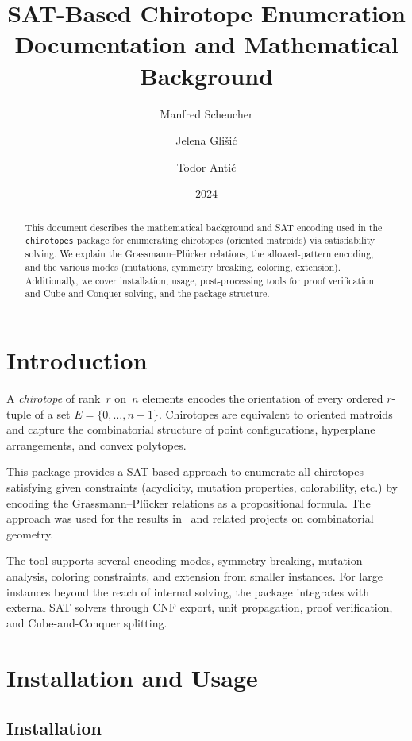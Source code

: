 \documentclass[11pt]{article}
\title{SAT-Based Chirotope Enumeration\\[0.3em]
\large Documentation and Mathematical Background}
\author{Manfred Scheucher \and Jelena Gli\v{s}i\'{c} \and Todor Anti\'{c}}
\date{2024}
\theoremstyle{definition}
\begin{document}
\maketitle

\begin{abstract}
This document describes the mathematical background and SAT encoding used in the \texttt{chirotopes} package for enumerating chirotopes (oriented matroids) via satisfiability solving.
We explain the Grassmann--Pl\"ucker relations, the allowed-pattern encoding, and the various modes (mutations, symmetry breaking, coloring, extension).
Additionally, we cover installation, usage, post-processing tools for proof verification and Cube-and-Conquer solving, and the package structure.
\end{abstract}

\tableofcontents

\section{Introduction}

A \emph{chirotope} of rank~$r$ on~$n$ elements encodes the orientation of every ordered $r$-tuple of a set $E = \{0, \ldots, n-1\}$. Chirotopes are equivalent to oriented matroids and capture the combinatorial structure of point configurations, hyperplane arrangements, and convex polytopes.

This package provides a SAT-based approach to enumerate all chirotopes satisfying given constraints (acyclicity, mutation properties, colorability, etc.) by encoding the Grassmann--Pl\"ucker relations as a propositional formula. The approach was used for the results in~\cite{EmptyHexagon} and related projects on combinatorial geometry.

The tool supports several encoding modes, symmetry breaking, mutation analysis, coloring constraints, and extension from smaller instances. For large instances beyond the reach of internal solving, the package integrates with external SAT solvers through CNF export, unit propagation, proof verification, and Cube-and-Conquer splitting.

\section{Installation and Usage}

\subsection{Installation}
\end{document}
